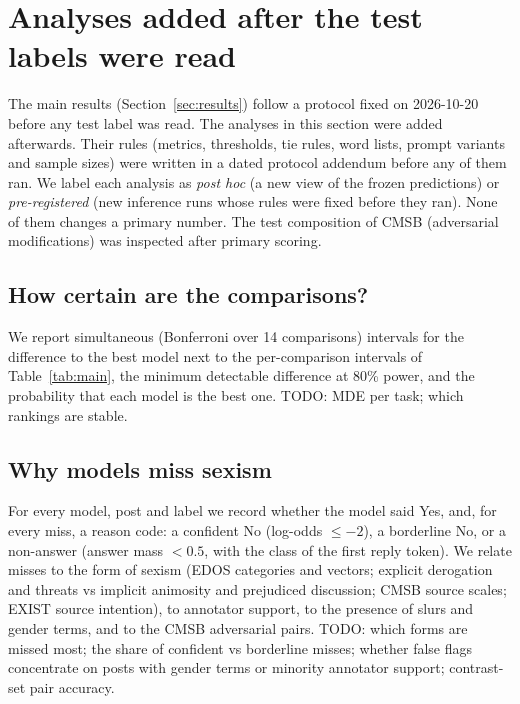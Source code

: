 
\section{Analyses added after the test labels were read}
\label{sec:posthoc}
The main results (Section~\ref{sec:results}) follow a protocol fixed on 2026-10-20 before any test label was read.
The analyses in this section were added afterwards. Their rules (metrics, thresholds, tie rules, word lists, prompt
variants and sample sizes) were written in a dated protocol addendum before any of them ran. We label each
analysis as \emph{post hoc} (a new view of the frozen predictions) or \emph{pre-registered} (new inference runs
whose rules were fixed before they ran). None of them changes a primary number. The test composition of CMSB
(adversarial modifications) was inspected after primary scoring.

\subsection{How certain are the comparisons?}
We report simultaneous (Bonferroni over 14 comparisons) intervals for the difference to the best model next to the
per-comparison intervals of Table~\ref{tab:main}, the minimum detectable difference at 80\% power, and the
probability that each model is the best one. TODO: MDE per task; which rankings are stable.

\subsection{Why models miss sexism}
\label{sec:failure}
For every model, post and label we record whether the model said Yes, and, for every miss, a reason code: a
confident No (log-odds $\le -2$), a borderline No, or a non-answer (answer mass $< 0.5$, with the class of the
first reply token). We relate misses to the form of sexism (EDOS categories and vectors; explicit derogation and
threats vs implicit animosity and prejudiced discussion; CMSB source scales; EXIST source intention), to annotator
support, to the presence of slurs and gender terms, and to the CMSB adversarial pairs.
TODO: which forms are missed most; the share of confident vs borderline misses; whether false flags concentrate
on posts with gender terms or minority annotator support; contrast-set pair accuracy.

